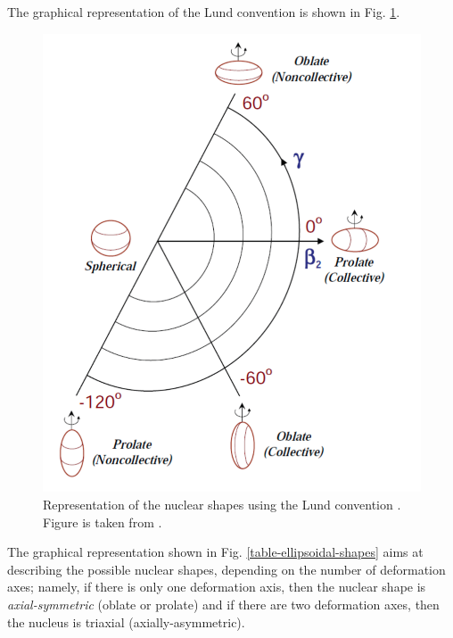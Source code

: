 The graphical representation of the Lund convention is shown in Fig. \ref{lund-convention-graph}.
\begin{figure}
    \centering
    \includegraphics[scale=0.3]{Chapters/Figures/lund-convention-plot.pdf}
    \caption{Representation of the nuclear shapes using the Lund convention \cite{andersson1976nuclear}. Figure is taken from \cite{matta2017exotic}.}
    \label{lund-convention-graph}
\end{figure}

The graphical representation shown in Fig. \ref{table-ellipsoidal-shapes} aims at describing the possible nuclear shapes, depending on the number of deformation axes; namely, if there is only one deformation axis, then the nuclear shape is \emph{axial-symmetric} (oblate or prolate) and if there are two deformation axes, then the nucleus is triaxial (axially-asymmetric).

